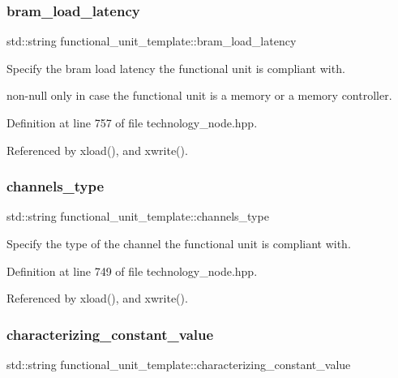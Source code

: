 \subsubsection{\texorpdfstring{bram\+\_\+load\+\_\+latency}{bram\_load\_latency}}
{\footnotesize\ttfamily std\+::string functional\+\_\+unit\+\_\+template\+::bram\+\_\+load\+\_\+latency}



Specify the bram load latency the functional unit is compliant with. 

non-\/null only in case the functional unit is a memory or a memory controller. 

Definition at line 757 of file technology\+\_\+node.\+hpp.



Referenced by xload(), and xwrite().

\mbox{\label{structfunctional__unit__template_a4dee53a7a7f1a176381561806cbc50d9}} 
\subsubsection{\texorpdfstring{channels\+\_\+type}{channels\_type}}
{\footnotesize\ttfamily std\+::string functional\+\_\+unit\+\_\+template\+::channels\+\_\+type}



Specify the type of the channel the functional unit is compliant with. 



Definition at line 749 of file technology\+\_\+node.\+hpp.



Referenced by xload(), and xwrite().

\mbox{\label{structfunctional__unit__template_a3dc55a57aa46776213c0ef8d4ad777dc}} 
\subsubsection{\texorpdfstring{characterizing\+\_\+constant\+\_\+value}{characterizing\_constant\_value}}
{\footnotesize\ttfamily std\+::string functional\+\_\+unit\+\_\+template\+::characterizing\+\_\+constant\+\_\+value}



